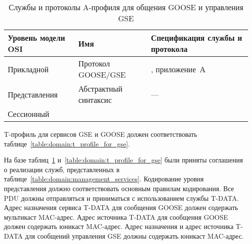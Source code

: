 \begin{table}[ht]
    \caption{Службы и протоколы A-профиля для общения GOOSE и управления GSE}
    \label{table:domain:gse_management}
    \begin{tabular}{| >{\raggedright}m{}
                    | >{\raggedright}m{}
                    | >{\raggedright\arraybackslash}m{}|}
        \hline
        \centering Уровень модели OSI &
        \centering Имя &
        \centering\arraybackslash Спецификация службы и протокола \\

        \hline
        Прикладной & Протокол GOOSE/GSE & \iecStdRef81, приложение~А \\

        \hline
        Представления & Абстрактный синтаксис & \centering\arraybackslash --- \\

        \hline
        Сессионный & & \\

        \hline
    \end{tabular}
\end{table}

T-профиль для сервисов GSE и GOOSE должен соответствовать
таблице~\ref{table:domain:t_profile_for_gse}.

На базе таблиц~\ref{table:domain:gse_management}
и~\ref{table:domain:t_profile_for_gse} были приняты соглашения о реализации служб,
представленных в таблице~\ref{table:domain:management_services}. Кодирование уровня
представления должно соответствовать основным правилам кодирования. Все PDU должны
отправляться и приниматься с использованием службы T-DATA. Адрес назначения сервиса
T-DATA для сообщения GOOSE должен содержать мультикаст MAC-адрес. Адрес источника
T-DATA для сообщения GOOSE должен содержать юникаст MAC-адрес. Адрес назначения
и адрес источника T-DATA для сообщений управления GSE должны содержать юникаст
MAC-адрес.


